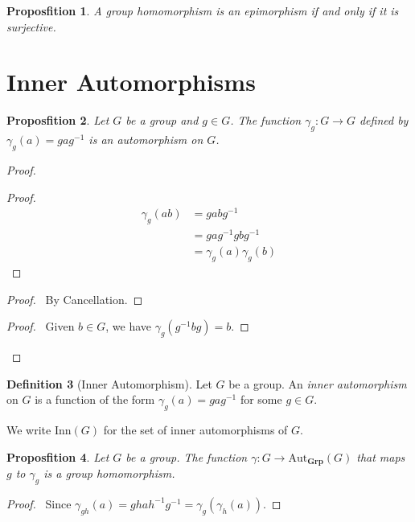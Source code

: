 \documentclass{book}
\let\qed\relax
\newtheorem{prop}{Proposfition}[chapter]
\theoremstyle{definition}
\newtheorem{df}[prop]{Definition}
\newcommand{\Aut}[2]{\ensuremath{\mathrm{Aut}_{#1} \left( {#2} \right)}}
\newcommand{\Grp}{\ensuremath{\mathbf{Grp}}}
\newcommand{\inv}[1]{\ensuremath{{#1}^{-1}}}
\begin{document}
\begin{prop}
A group homomorphism is an epimorphism if and only if it is surjective.
\end{prop}


\section{Inner Automorphisms}

\begin{prop}
    Let $G$ be a group and $g \in G$. The function $\gamma_g : G \rightarrow G$ defined by $\gamma_g(a) = ga\inv{g}$ is an automorphism on $G$.
\end{prop}

\begin{proof}
    \pf
    \begin{proof}
        \pf
        \begin{align*}
            \gamma_g(ab) & = gab\inv{g}              \\
                         & = ga\inv{g} gb\inv{g}     \\
                         & = \gamma_g(a) \gamma_g(b)
        \end{align*}
    \end{proof}
    \begin{proof}
        \pf\ By Cancellation.
    \end{proof}
    \begin{proof}
        \pf\ Given $b \in G$, we have $\gamma_g(\inv{g}bg) = b$.
    \end{proof}
    \qed
\end{proof}

\begin{df}[Inner Automorphism]
    Let $G$ be a group. An \emph{inner automorphism} on $G$ is a function of the form $\gamma_g(a) = ga\inv{g}$ for some $g \in G$.
    
    We write $\mathrm{Inn}(G)$ for the set of inner automorphisms of $G$.
\end{df}

\begin{prop}
    Let $G$ be a group.
    The function $\gamma : G \rightarrow \Aut{\Grp}{G}$ that maps $g$ to $\gamma_g$ is a group homomorphism.
\end{prop}

\begin{proof}
    \pf\ Since $\gamma_{gh}(a) = gha\inv{h}\inv{g} = \gamma_g(\gamma_h(a))$. \qed
\end{proof}
\end{document}
